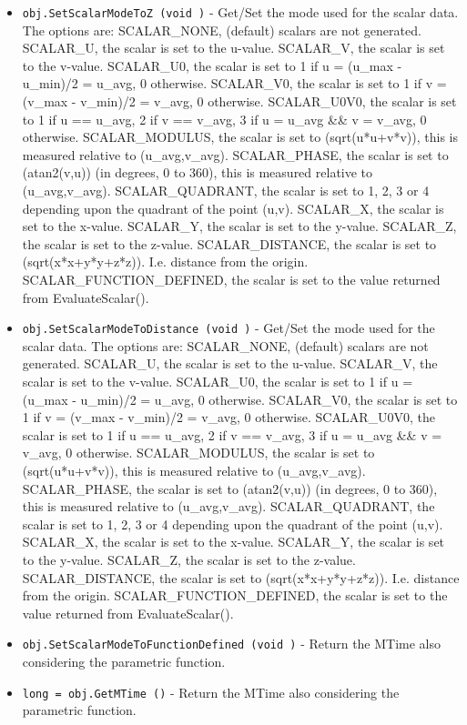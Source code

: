 \begin{itemize}
\item  \verb|obj.SetScalarModeToZ (void )| -  Get/Set the mode used for the scalar data.  The options are:
 SCALAR\_NONE, (default) scalars are not generated.
 SCALAR\_U, the scalar is set to the u-value. 
 SCALAR\_V, the scalar is set to the v-value.
 SCALAR\_U0, the scalar is set to 1 if u = (u\_max - u\_min)/2 = u\_avg, 0 otherwise.
 SCALAR\_V0, the scalar is set to 1 if v = (v\_max - v\_min)/2 = v\_avg, 0 otherwise.
 SCALAR\_U0V0, the scalar is 
   set to 1 if u == u\_avg, 2 if v == v\_avg, 3 if u = u\_avg \&\& v = v\_avg, 0 otherwise.
 SCALAR\_MODULUS, the scalar is set to (sqrt(u*u+v*v)), this is measured relative to (u\_avg,v\_avg).
 SCALAR\_PHASE, the scalar is set to (atan2(v,u)) (in degrees, 0 to 360), this is measured relative to (u\_avg,v\_avg).
 SCALAR\_QUADRANT, the scalar is set to 1, 2, 3 or 4 
   depending upon the quadrant of the point (u,v).
 SCALAR\_X, the scalar is set to the x-value. 
 SCALAR\_Y, the scalar is set to the y-value. 
 SCALAR\_Z, the scalar is set to the z-value. 
 SCALAR\_DISTANCE, the scalar is set to (sqrt(x*x+y*y+z*z)). I.e. distance from the origin.
 SCALAR\_FUNCTION\_DEFINED, the scalar is set to the value returned from EvaluateScalar().

\item  \verb|obj.SetScalarModeToDistance (void )| -  Get/Set the mode used for the scalar data.  The options are:
 SCALAR\_NONE, (default) scalars are not generated.
 SCALAR\_U, the scalar is set to the u-value. 
 SCALAR\_V, the scalar is set to the v-value.
 SCALAR\_U0, the scalar is set to 1 if u = (u\_max - u\_min)/2 = u\_avg, 0 otherwise.
 SCALAR\_V0, the scalar is set to 1 if v = (v\_max - v\_min)/2 = v\_avg, 0 otherwise.
 SCALAR\_U0V0, the scalar is 
   set to 1 if u == u\_avg, 2 if v == v\_avg, 3 if u = u\_avg \&\& v = v\_avg, 0 otherwise.
 SCALAR\_MODULUS, the scalar is set to (sqrt(u*u+v*v)), this is measured relative to (u\_avg,v\_avg).
 SCALAR\_PHASE, the scalar is set to (atan2(v,u)) (in degrees, 0 to 360), this is measured relative to (u\_avg,v\_avg).
 SCALAR\_QUADRANT, the scalar is set to 1, 2, 3 or 4 
   depending upon the quadrant of the point (u,v).
 SCALAR\_X, the scalar is set to the x-value. 
 SCALAR\_Y, the scalar is set to the y-value. 
 SCALAR\_Z, the scalar is set to the z-value. 
 SCALAR\_DISTANCE, the scalar is set to (sqrt(x*x+y*y+z*z)). I.e. distance from the origin.
 SCALAR\_FUNCTION\_DEFINED, the scalar is set to the value returned from EvaluateScalar().

\item  \verb|obj.SetScalarModeToFunctionDefined (void )| -  Return the MTime also considering the parametric function.

\item  \verb|long = obj.GetMTime ()| -  Return the MTime also considering the parametric function.

\end{itemize}
